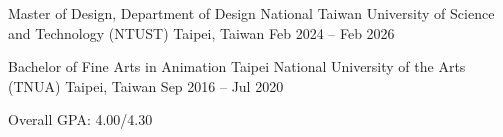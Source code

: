 \vspace{0.4mm}

\begin{cventries}

  \cventry
    {Master of Design, Department of Design} %
    {National Taiwan University of Science and Technology (NTUST)} %
    {Taipei, Taiwan} %
    {Feb 2024 -- Feb 2026} %
    {
      \vspace{-4.0mm}
    }


  \cventry
    {Bachelor of Fine Arts in Animation} %
    {Taipei National University of the Arts (TNUA)} %
    {Taipei, Taiwan} %
    {Sep 2016 -- Jul 2020} %
    {
      \vspace{-4.0mm}
      \begin{cvitems} %
        \item {Overall GPA: 4.00/4.30}
      \end{cvitems}
    }
\end{cventries}
